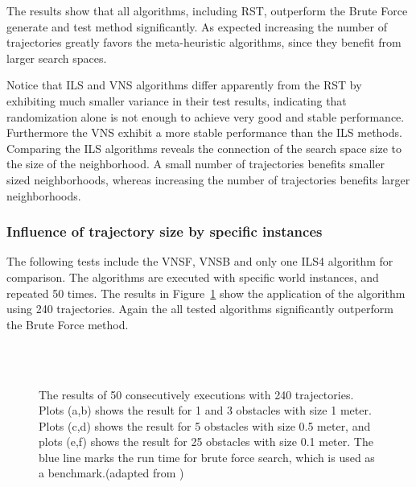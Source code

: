 The results show that all algorithms, including RST, outperform the Brute Force generate and test method significantly. 
As expected increasing the number of trajectories greatly favors the meta-heuristic algorithms, since they benefit from larger search spaces. 

Notice that ILS and VNS algorithms differ apparently from the RST by exhibiting much smaller variance in their test results, indicating that randomization alone is not enough to achieve very good and stable performance.
Furthermore the VNS exhibit a more stable performance than the ILS methods. 
Comparing the ILS algorithms reveals the connection of the search space size to the size of the neighborhood. 
A small number of trajectories benefits smaller sized neighborhoods, whereas increasing the number of trajectories benefits larger neighborhoods. 

\subsubsection{Influence of trajectory size by specific instances}
The following tests include the VNSF, VNSB and only one ILS4 algorithm for comparison. 
The algorithms are executed with specific world instances, and repeated 50 times. 
The results in Figure~\ref{fig:fig_special_240} show the application of the algorithm using 240 trajectories. Again the all tested algorithms significantly outperform the Brute Force method. 

\begin{figure}[thpb]
   \myfloatalign
    \tiny
          \centering
    \\
    \\
    \caption[Experiment: Specific instances with 240 trajectories]{The results of 50 consecutively executions with 240 trajectories. Plots (a,b) shows the result for 1 and 3 obstacles with size 1 meter. Plots (c,d) shows the result for 5 obstacles with size 0.5 meter, and plots (e,f) shows the result for 25 obstacles with size 0.1 meter. The blue line marks the run time for brute force search, which is used as a benchmark.(adapted from \cite{myself})}  
     \label{fig:fig_special_240}
\end{figure}

